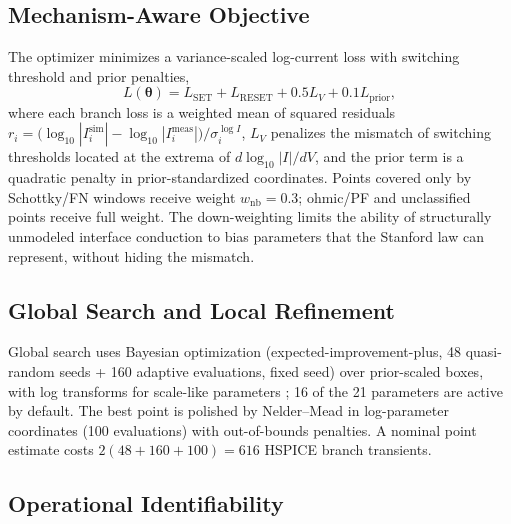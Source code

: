 \documentclass[journal]{IEEEtran}
\begin{document}
\subsection{Mechanism-Aware Objective}
\label{sec:loss}

The optimizer minimizes a variance-scaled log-current loss with switching
threshold and prior penalties,
\begin{equation}
  L(\boldsymbol{\theta})
  =
  L_{\mathrm{SET}}+L_{\mathrm{RESET}}
  +0.5L_V+0.1L_{\mathrm{prior}},
  \label{eq:loss}
\end{equation}
where each branch loss is a weighted mean of squared residuals
$r_i=\bigl(\log_{10}|I_i^{\mathrm{sim}}|-\log_{10}|I_i^{\mathrm{meas}}|
\bigr)/\sigma_i^{\log I}$, $L_V$ penalizes the mismatch of switching
thresholds located at the extrema of $d\log_{10}|I|/dV$, and the prior term
is a quadratic penalty in prior-standardized coordinates.  Points covered
only by Schottky/FN windows receive weight $w_{\mathrm{nb}}=0.3$; ohmic/PF
and unclassified points receive full weight.  The down-weighting limits the
ability of structurally unmodeled interface conduction to bias parameters
that the Stanford law can represent, without hiding the mismatch.

\subsection{Global Search and Local Refinement}
\label{sec:opt}

Global search uses Bayesian optimization (expected-improvement-plus, 48
quasi-random seeds + 160 adaptive evaluations, fixed seed) over prior-scaled
boxes, with log transforms for scale-like parameters
\cite{snoek2012practical}; 16 of the 21 parameters are active by default.
The best point is polished by Nelder--Mead in log-parameter coordinates (100
evaluations) with out-of-bounds penalties.  A nominal point estimate costs
$2(48+160+100)=616$ HSPICE branch transients.

\subsection{Operational Identifiability}
\label{sec:ident}
\end{document}
